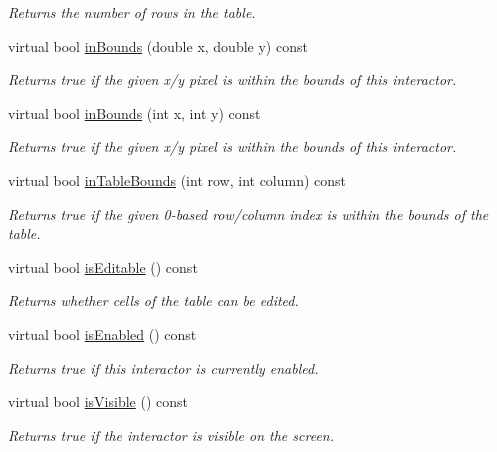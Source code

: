 \begin{DoxyCompactItemize}
\begin{DoxyCompactList}\small\item\em Returns the number of rows in the table. \end{DoxyCompactList}\item 
virtual bool \mbox{\hyperlink{classGInteractor_afc480f652b8c5f1fb255e2269ce68879}{in\+Bounds}} (double x, double y) const
\begin{DoxyCompactList}\small\item\em Returns true if the given x/y pixel is within the bounds of this interactor. \end{DoxyCompactList}\item 
virtual bool \mbox{\hyperlink{classGInteractor_ae6d7982c1c627b677a5e776ca86118ed}{in\+Bounds}} (int x, int y) const
\begin{DoxyCompactList}\small\item\em Returns true if the given x/y pixel is within the bounds of this interactor. \end{DoxyCompactList}\item 
virtual bool \mbox{\hyperlink{classGTable_adcc2e619680a96a5b266d18a9ff2cdf4}{in\+Table\+Bounds}} (int row, int column) const
\begin{DoxyCompactList}\small\item\em Returns true if the given 0-\/based row/column index is within the bounds of the table. \end{DoxyCompactList}\item 
virtual bool \mbox{\hyperlink{classGTable_a012b5afb54e037e6c5498cf0932a521b}{is\+Editable}} () const
\begin{DoxyCompactList}\small\item\em Returns whether cells of the table can be edited. \end{DoxyCompactList}\item 
virtual bool \mbox{\hyperlink{classGInteractor_aacb819fb241851fd9fc045271baa4034}{is\+Enabled}} () const
\begin{DoxyCompactList}\small\item\em Returns true if this interactor is currently enabled. \end{DoxyCompactList}\item 
virtual bool \mbox{\hyperlink{classGInteractor_a9d8a6cfb13917785c143e74d40e4e2be}{is\+Visible}} () const
\begin{DoxyCompactList}\small\item\em Returns true if the interactor is visible on the screen. \end{DoxyCompactList}\item 

\end{DoxyCompactItemize}
